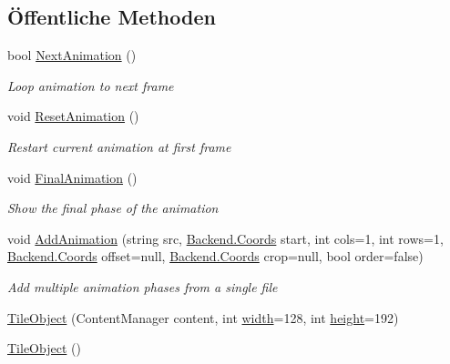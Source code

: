 \subsection*{Öffentliche Methoden}
\begin{DoxyCompactItemize}
\item 
bool \hyperlink{class_gruppe22_1_1_client_1_1_tile_object_a73d2b8e84dd9f8ec02a74cc122bd61f2}{Next\-Animation} ()
\begin{DoxyCompactList}\small\item\em Loop animation to next frame \end{DoxyCompactList}\item 
void \hyperlink{class_gruppe22_1_1_client_1_1_tile_object_a31fe95c4ae53e15acacb245a35690d72}{Reset\-Animation} ()
\begin{DoxyCompactList}\small\item\em Restart current animation at first frame \end{DoxyCompactList}\item 
void \hyperlink{class_gruppe22_1_1_client_1_1_tile_object_ab807224e88c66c53e8ca355e1dc88ee6}{Final\-Animation} ()
\begin{DoxyCompactList}\small\item\em Show the final phase of the animation \end{DoxyCompactList}\item 
void \hyperlink{class_gruppe22_1_1_client_1_1_tile_object_a87b07352fbf1a1ed6ed283c4f390d785}{Add\-Animation} (string src, \hyperlink{class_gruppe22_1_1_backend_1_1_coords}{Backend.\-Coords} start, int cols=1, int rows=1, \hyperlink{class_gruppe22_1_1_backend_1_1_coords}{Backend.\-Coords} offset=null, \hyperlink{class_gruppe22_1_1_backend_1_1_coords}{Backend.\-Coords} crop=null, bool order=false)
\begin{DoxyCompactList}\small\item\em Add multiple animation phases from a single file \end{DoxyCompactList}\item 
\hyperlink{class_gruppe22_1_1_client_1_1_tile_object_a8d869a4075b393c7bb3e6728e6be439d}{Tile\-Object} (Content\-Manager content, int \hyperlink{class_gruppe22_1_1_client_1_1_tile_object_ad12970584aeb4e8ddcc748cbd24e11bd}{width}=128, int \hyperlink{class_gruppe22_1_1_client_1_1_tile_object_a6bfc3a726f20db8d708c172cf5488df9}{height}=192)
\item 
\hyperlink{class_gruppe22_1_1_client_1_1_tile_object_acb85b1d844b7d2d77d7c43ddd9b991ed}{Tile\-Object} ()

\end{DoxyCompactItemize}
